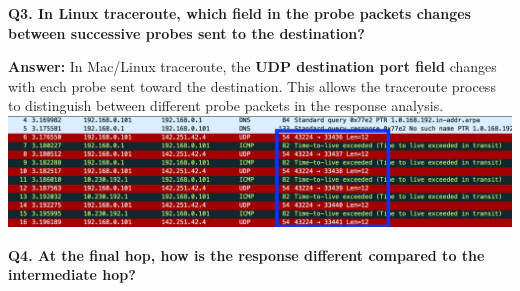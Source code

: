 \documentclass[12pt, a4paper]{report}
\begin{document}
\textbf{Q3. In Linux traceroute, which field in the probe packets changes between successive probes sent to the destination?}

\textbf{Answer:}  In Mac/Linux traceroute, the \textbf{UDP destination port field} changes with each probe sent toward the destination. This allows the traceroute process to distinguish between different probe packets in the response analysis.
\\
\includegraphics[width=1\linewidth]{images/image copy 2.png}

\textbf{Q4. At the final hop, how is the response different compared to the intermediate hop?}
\end{document}
